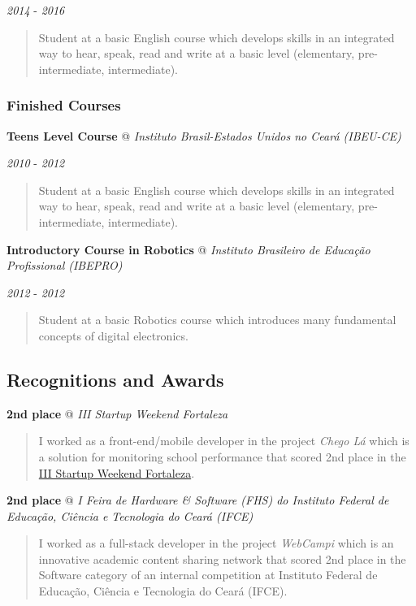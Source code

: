 \documentclass[]{article}
\begin{document}
\emph{2014} - \emph{2016}

\begin{quote}
Student at a basic English course which develops skills in an integrated
way to hear, speak, read and write at a basic level (elementary,
pre-intermediate, intermediate).
\end{quote}

\subsubsection{Finished Courses}\label{finished-courses}

\textbf{Teens Level Course} @ \emph{Instituto Brasil-Estados Unidos no
Ceará (IBEU-CE)}

\emph{2010} - \emph{2012}

\begin{quote}
Student at a basic English course which develops skills in an integrated
way to hear, speak, read and write at a basic level (elementary,
pre-intermediate, intermediate).
\end{quote}

\textbf{Introductory Course in Robotics} @ \emph{Instituto Brasileiro de
Educação Profissional (IBEPRO)}

\emph{2012} - \emph{2012}

\begin{quote}
Student at a basic Robotics course which introduces many fundamental
concepts of digital electronics.
\end{quote}

\subsection{Recognitions and Awards}\label{recognitions-and-awards}

\textbf{2nd place} @ \emph{III Startup Weekend Fortaleza}

\begin{quote}
I worked as a front-end/mobile developer in the project \emph{Chego Lá}
which is a solution for monitoring school performance that scored 2nd
place in the
\href{http://www.up.co/communities/brazil/fortaleza/startup-weekend/4487}{III
Startup Weekend Fortaleza}.
\end{quote}

\textbf{2nd place} @ \emph{I Feira de Hardware \& Software (FHS) do
Instituto Federal de Educação, Ciência e Tecnologia do Ceará (IFCE)}

\begin{quote}
I worked as a full-stack developer in the project \emph{WebCampi} which
is an innovative academic content sharing network that scored 2nd place
in the Software category of an internal competition at Instituto Federal
de Educação, Ciência e Tecnologia do Ceará (IFCE).
\end{quote}
\end{document}
